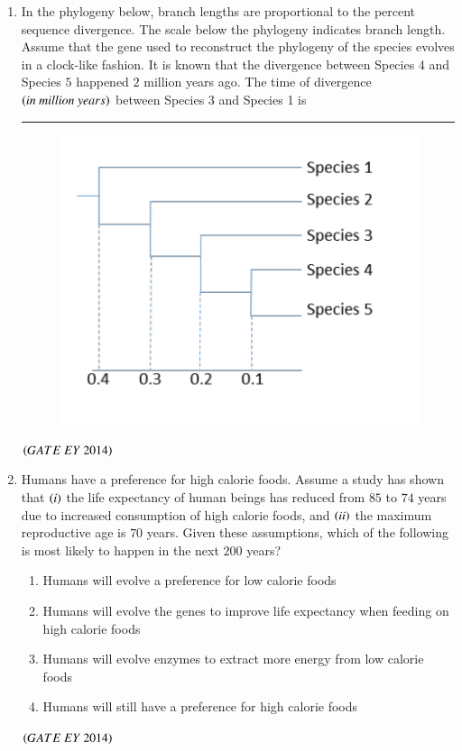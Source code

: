 \documentclass[journal]{IEEEtran}
\numberwithin{equation}{enumi}
\numberwithin{figure}{enumi}
\begin{document}
\begin{enumerate}
    \item In the phylogeny below, branch lengths are proportional to the percent sequence divergence. The scale below the phylogeny indicates branch length. Assume that the gene used to reconstruct the phylogeny of the species evolves in a clock-like fashion. It is known that the divergence between Species $4$ and Species $5$ happened $2$ million years ago. The time of divergence $\left(in\ million\ years\right)$ between Species 3 and Species 1 is \rule{3cm}{0.15mm}
    \begin{figure}[H]
    \centering
    \includegraphics[width=0.7\columnwidth]{figs/13.png}
    \caption{}
    \label{fig:13}
   \end{figure}
    \hfill{$\brak{ GATE\ EY\ 2014}$}
    \bigskip
    
    \item Humans have a preference for high calorie foods. Assume a study has shown that $\left(i\right)$ the life expectancy of human beings has reduced from 
    $85$ to $74$ years due to increased consumption of high calorie foods, and $\left(ii\right)$ the maximum reproductive age is $70$ years. Given these assumptions, which of the following is most likely to happen in the next $200$ years?
    \begin{enumerate}
        \item Humans will evolve a preference for low calorie foods
        \item Humans will evolve the genes to improve life expectancy when feeding on high calorie foods
        \item Humans will evolve enzymes to extract more energy from low calorie foods
        \item Humans will still have a preference for high calorie foods
    \end{enumerate}
    \hfill{$\brak{ GATE\ EY\ 2014}$}
    \bigskip
    

\end{enumerate}
\end{document}
